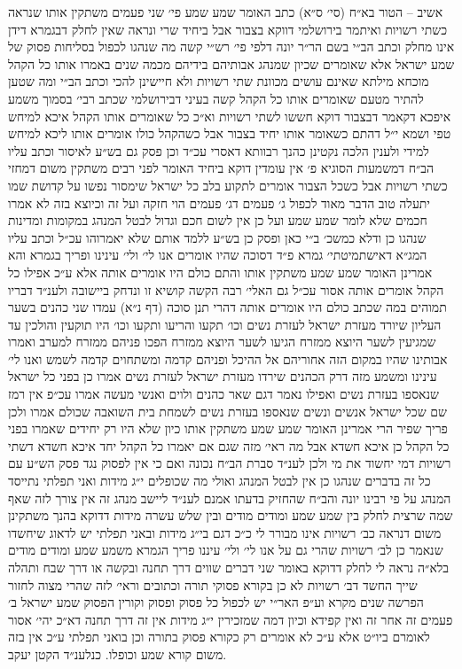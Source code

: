\documentclass[12pt, openany]{book}
\begin{document}
\begin{multicols}{2}
אשיב – הטור בא״ח (סי׳ ס״א) כתב האומר שמע שמע פי׳ שני פעמים משתקין אותו שנראה כשתי רשויות ואיתמר בירושלמי דווקא בצבור אבל ביחיד שרי ונראה שאין לחלק דבגמרא דידן אינו מחלק וכתב הב״י בשם הר״ר יונה דלפי פי׳ רש״י קשה מה שנהגו לכפול בסליחות פסוק של שמע ישראל אלא שאומרים שכיון שמנהג אבותיהם בידיהם מכמה שנים באמרו אותו כל הקהל מוכחא מילתא שאינם עושים מכוונת שתי רשויות ולא חיישינן להכי וכתב הב״י ומה שטען להתיר מטעם שאומרים אותו כל הקהל קשה בעיני דבירושלמי שכתב רבי׳ בסמוך משמע איפכא דקאמר דבצבור דוקא חששו לשתי רשויות וא״כ כל שאומרים אותו הקהל איכא למיחש טפי ושמא י״ל דהתם כשאומר אותו יחיד בצבור אבל כשהקהל כולו אומרים אותו ליכא למיחש למידי ולענין הלכה נקטינן כהנך רבוותא דאסרי עכ״ד וכן פסק גם בש״ע לאיסור וכתב עליו הב״ח דמשמעות הסוגיא פ׳ אין עומדין דוקא ביחיד האומר לפני רבים משתקין משום דמחזי כשתי רשויות אבל כשכל הצבור אומרים לתקוע בלב כל ישראל שימסור נפשו על קדושת שמו יתעלה טוב הדבר מאוד לכפול ג׳ פעמים דג׳ פעמים הוי חזקה ועל זה וכיוצא בזה לא אמרו חכמים שלא לומר שמע שמע ועל כן אין לשום חכם וגדול לבטל המנהג במקומות ומדינות שנהגו כן ודלא כמשכ׳ ב״י כאן ופסק כן בש״ע ללמד אותם שלא יאמרוהו עכ״ל וכתב עליו המג״א דאישתמיטתי׳ גמרא פ״ד דסוכה שהיו אומרים אנו לי׳ ולי׳ עינינו ופריך בגמרא והא אמרינן האומר שמע שמע משתקין אותו והתם כולם היו אומרים אותה אלא ע״כ אפילו כל הקהל אומרים אותה אסור עכ״ל גם האלי׳ רבה הקשה קושיא זו ונדחק ביישובה ולענ״ד דבריו תמוהים במה שכתב כולם היו אומרים אותה דהרי תנן סוכה (דף נ״א) עמדו שני כהנים בשער העליון שיורד מעזרת ישראל לעזרת נשים וכו׳ תקעו והריעו ותקעו וכו׳ היו תוקעין והולכין עד שמגיעין לשער היוצא ממזרח הגיעו לשער היוצא ממזרח הפכו פניהם ממזרח למערב ואמרו אבותינו שהיו במקום הזה אחוריהם אל ההיכל ופניהם קדמה ומשתחוים קדמה לשמש ואנו לי׳ עינינו ומשמע מזה דרק הכהנים שירדו מעזרת ישראל לעזרת נשים אמרו כן בפני כל ישראל שנאספו בעזרת נשים ואפילו נאמר דגם שאר כהנים ולוים ואנשי מעשה אמרו עכ״פ אין רמז שם שכל ישראל אנשים ונשים שנאספו בעזרת נשים לשמחת בית השואבה שכולם אמרו ולכן פריך שפיר הרי אמרינן האומר שמע שמע משתקין אותו כיון שלא היו רק יחידים שאמרו בפני כל הקהל כן איכא חשדא אבל מה ראי׳ מזה שגם אם יאמרו כל הקהל יחד איכא חשדא דשתי רשויות דמי יחשוד את מי ולכן לענ״ד סברת הב״ח נכונה ואם כי אין לפסוק נגד פסק הש״ע עם כל זה בדברים שנהגו כן אין לבטל המנהג ואולי מה שכופלים י״ג מידות ואני תפלתי נתייסד המנהג על פי רבינו יונה והב״ח שהחזיק בדעתו אמנם לענ״ד ליישב מנהג זה אין צורך לזה שאף שמה שרצית לחלק בין שמע שמע ומודים מודים ובין שלש עשרה מידות דדוקא בהנך משתקינן משום דנראה כב׳ רשויות אינו מבורר לי כ״כ דגם בי״ג מידות ובאני תפלתי יש לדאוג שיחשדו שנאמר כן לב׳ רשויות שהרי גם על אנו לי׳ ולי׳ עיננו פריך הגמרא משמע שמע ומודים מודים בלא״ה נראה לי לחלק דדוקא באומר שני דברים שווים דרך תחנה ובקשה או דרך שבח ותהלה שייך החשד דב׳ רשויות לא כן בקורא פסוקי תורה וכתובים וראי׳ לזה שהרי מצוה לחזור הפרשה שנים מקרא וע״פ האר״י יש לכפול כל פסוק ופסוק וקורין הפסוק שמע ישראל ב׳ פעמים זה אחר זה ואין קפידא וכיון דמה שמזכירין י״ג מידות אין זה דרך תחנה דא״כ יהי׳ אסור לאומרם ביו״ט אלא ע״כ לא אומרים רק כקורא פסוק בתורה וכן בואני תפלתי ע״כ אין בזה משום קורא שמע וכופלו. כנלענ״ד הקטן יעקב.\\\vspace{0pt}

\end{multicols}\newpage
\end{document}
